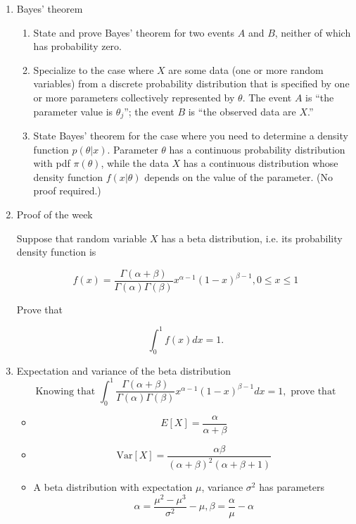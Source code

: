 \documentclass[12pt]{article}
\begin{document}
\begin{enumerate}

\item Bayes' theorem

\begin{enumerate}
\item State and prove Bayes' theorem for two events $A$ and $B$, neither of which has probability zero.
\vspace{100 pt}


\item Specialize to the case where $X$ are some data (one or more random variables) from a discrete probability distribution that is specified by one or more parameters collectively represented by $\theta$. The event $A$ is ``the parameter value is $\theta_j$''; the event $B$ is ``the observed data are $X$.''
\vspace{150 pt}

\item State Bayes' theorem for the case where you need to determine a density function $p(\theta |x)$. Parameter $\theta$ has a continuous probability distribution with pdf $\pi(\theta)$, while the data $X$ has a continuous distribution whose density function $f(x | \theta)$ depends on the value of the parameter. (No proof required.)

\end{enumerate}

\pagebreak




\item Proof of the week

 Suppose that random variable $X$ has a beta distribution, i.e. its probability density function is

$$f(x) = \frac{\Gamma(\alpha + \beta)}{\Gamma(\alpha)\Gamma(\beta)} x^{\alpha-1}(1-x)^{\beta-1}, 0 \leq x \leq 1$$

Prove that

$$\int_0^1 f(x) dx  = 1.$$

\pagebreak
\item Expectation and variance of the beta distribution
$$\text{Knowing that }\int_0^1  \frac{\Gamma(\alpha + \beta)}{\Gamma(\alpha)\Gamma(\beta)} x^{\alpha-1}(1-x)^{\beta-1}dx  = 1,\text{ 
prove that}$$
\begin{itemize}
\item $$E[X] = \frac{\alpha}{\alpha + \beta}$$
\item $$\text{Var}[X] = \frac{\alpha\beta}{(\alpha + \beta)^2(\alpha + \beta+1)}$$
\item A beta distribution with expectation $\mu$, variance $\sigma^2$ has parameters
$$\alpha = \frac{\mu^2 - \mu^3}{\sigma^2} - \mu, \beta = \frac{\alpha}{\mu} - \alpha$$



\end{itemize}
\end{enumerate}
\end{document}
